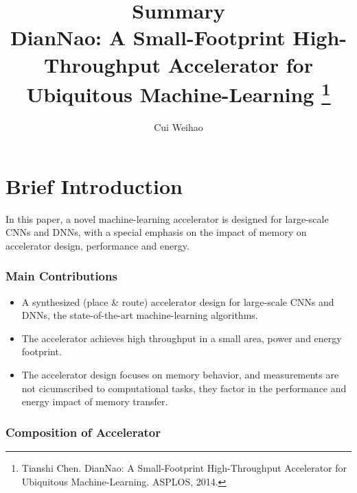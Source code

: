 \documentclass[10pt]{article}
\title{{\Huge Summary}\\{\Large{DianNao: A Small-Footprint
High-Throughput Accelerator for Ubiquitous Machine-Learning
\footnote{Tianshi Chen. DianNao: A Small-Footprint
High-Throughput Accelerator for Ubiquitous Machine-Learning.
ASPLOS, 2014.}}}}
\author{Cui Weihao}
\affiliation{SJTU}
\begin{document}
    \maketitle
    \flushbottom
    \newpage
    \pagestyle{fancynotes}
    \part{Brief Introduction}
    In this paper, a novel machine-learning accelerator is designed for
    large-scale CNNs and DNNs, with a special emphasis on the impact
    of memory on accelerator design, performance and energy.
    \section{Main Contributions}
    \begin{itemize}
        \item A synthesized (place \& route) accelerator design for
        large-scale CNNs and DNNs, the state-of-the-art
        machine-learning algorithms.
        \item The accelerator achieves high throughput in a small area,
        power and energy footprint.
        \item The accelerator design focuses on memory behavior, and
        measurements are not cicumscribed to computational tasks, they
        factor in the performance and energy impact of memory transfer.
    \end{itemize}
    \section{Composition of Accelerator}
\end{document}
